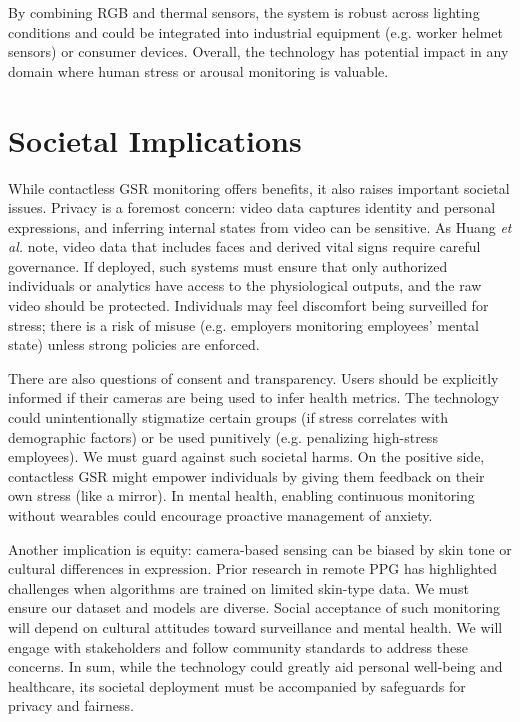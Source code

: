 \documentclass[12pt]{article}
\begin{document}
    By combining RGB and thermal sensors, the system is robust across lighting conditions and could be integrated into industrial equipment (e.g. worker helmet sensors) or consumer devices. Overall, the technology has potential impact in any domain where human stress or arousal monitoring is valuable.


    \section{Societal Implications}
    While contactless GSR monitoring offers benefits, it also raises important societal issues. Privacy is a foremost concern: video data captures identity and personal expressions, and inferring internal states from video can be sensitive. As Huang \emph{et al.} note, video data that includes faces and derived vital signs require careful governance. If deployed, such systems must ensure that only authorized individuals or analytics have access to the physiological outputs, and the raw video should be protected. Individuals may feel discomfort being surveilled for stress; there is a risk of misuse (e.g. employers monitoring employees' mental state) unless strong policies are enforced.

    There are also questions of consent and transparency. Users should be explicitly informed if their cameras are being used to infer health metrics. The technology could unintentionally stigmatize certain groups (if stress correlates with demographic factors) or be used punitively (e.g. penalizing high-stress employees). We must guard against such societal harms. On the positive side, contactless GSR might empower individuals by giving them feedback on their own stress (like a mirror). In mental health, enabling continuous monitoring without wearables could encourage proactive management of anxiety.

    Another implication is equity: camera-based sensing can be biased by skin tone or cultural differences in expression. Prior research in remote PPG has highlighted challenges when algorithms are trained on limited skin-type data. We must ensure our dataset and models are diverse. Social acceptance of such monitoring will depend on cultural attitudes toward surveillance and mental health. We will engage with stakeholders and follow community standards to address these concerns. In sum, while the technology could greatly aid personal well-being and healthcare, its societal deployment must be accompanied by safeguards for privacy and fairness.
\end{document}
